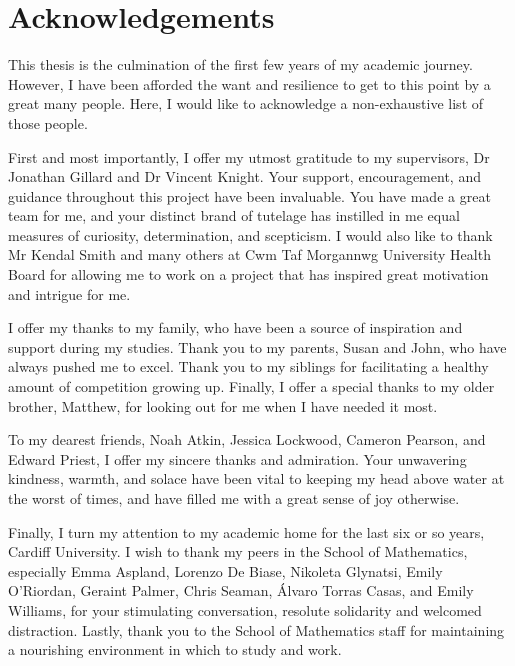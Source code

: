 \chapter*{Acknowledgements}

This thesis is the culmination of the first few years of my academic journey.
However, I have been afforded the want and resilience to get to this point by
a great many people. Here, I would like to acknowledge a non-exhaustive list of
those people.

First and most importantly, I offer my utmost gratitude to my supervisors, Dr
Jonathan Gillard and Dr Vincent Knight. Your support, encouragement, and
guidance throughout this project have been invaluable. You have made a great
team for me, and your distinct brand of tutelage has instilled in me equal
measures of curiosity, determination, and scepticism. I would also like to thank
Mr Kendal Smith and many others at Cwm Taf Morgannwg University Health Board for
allowing me to work on a project that has inspired great motivation and intrigue
for me.

I offer my thanks to my family, who have been a source of inspiration and
support during my studies. Thank you to my parents, Susan and John, who have
always pushed me to excel. Thank you to my siblings for facilitating a healthy
amount of competition growing up. Finally, I offer a special thanks to my older
brother, Matthew, for looking out for me when I have needed it most.

To my dearest friends, Noah Atkin, Jessica Lockwood, Cameron Pearson, and Edward
Priest, I offer my sincere thanks and admiration. Your unwavering kindness,
warmth, and solace have been vital to keeping my head above water at the worst
of times, and have filled me with a great sense of joy otherwise.

Finally, I turn my attention to my academic home for the last six or so years,
Cardiff University. I wish to thank my peers in the School of Mathematics,
especially Emma Aspland, Lorenzo De Biase, Nikoleta Glynatsi, Emily O'Riordan,
Geraint Palmer, Chris Seaman, \'{A}lvaro Torras Casas, and Emily Williams, for
your stimulating conversation, resolute solidarity and welcomed distraction.
Lastly, thank you to the School of Mathematics staff for maintaining a
nourishing environment in which to study and work. 
